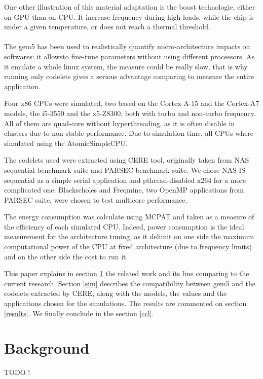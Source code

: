 \documentclass{article}
\begin{document}
\begin{multicols}{2}
One other illustration of this material adaptation is the boost technologie, either on GPU than on CPU. It increase frequency during high loads, while the chip is under a given temperature, or does not reach a thermal threshold. %

\paragraph{}
The gem5\cite{gem5-sim} has been used to realistically quantify micro-architecture impacts on softwares: it allowsto fine-tune parameters without using different processors. As it emulate a whole linux system, the measure could be really slow, that is why running only codelets gives a serious advantage comparing to measure the entire application. 

Four x86 CPUs were simulated, two based on the Cortex A-15 and the Cortex-A7 models\cite{DBLP:conf/samos/EndoCC14}, the i5-3550 and the x5-Z8300, both with turbo and non-turbo frequency. All of them are quad-core without hyperthreading, as it is often disable in clusters due to non-stable performance. %
Due to simulation time, all CPUs where simulated using the AtomicSimpleCPU.

The codelets used were extracted using CERE\cite{CERE} tool, originally taken from NAS\cite{NAS} sequential benchmark suite and PARSEC\cite{PARSEC} benchmark suite. We chose NAS IS sequential as a simple serial application and pthread-disabled x264 for a more complicated one. Blackscholes and Freqmine, two OpenMP applications from PARSEC suite, were chosen to test multicore performance.


The energy consumption was calculate using MCPAT\cite{MCPAT} and taken as a measure of the efficiency of each simulated CPU. Indeed, power consumption is the ideal measurement for the architecture tuning, as it delimit on one side the maximum computational power of the CPU at fixed architecture (due to frequency limits) and on the other side the cost to run it.

This paper explains in section \ref{bckgrnd} the related work and its line comparing to the current research. Section \ref{sim} describes the compatibility between gem5 and the codelets extracted by CERE, along with the models, the values and the applications chosen for the simulations. The results are commented on section \ref{results}. We finally conclude in the section \ref{ccl}.


\section{Background}
\label{bckgrnd}
TODO !


\end{multicols}
\end{document}
